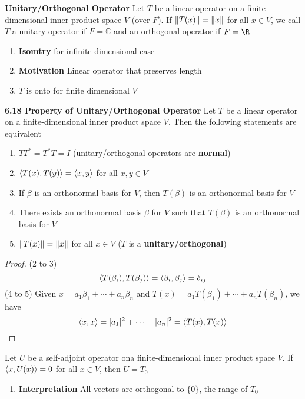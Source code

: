 \documentclass[11pt]{article}
\begin{document}

\begin{defn*}
    \textbf{Unitary/Orthogonal Operator} Let $T$ be a linear operator on a finite-dimensional inner product space $V$ (over $F$). If $\left\lVert T(x)\right\rVert = \left\lVert x\right\rVert$ for all $x\in V$, we call $T$ a unitary operator if $F = \mathbb{C}$ and an orthogonal operator if $F = \R$
    \begin{enumerate}
        \item \textbf{Isomtry} for infinite-dimensional case 
        \item \textbf{Motivation} Linear operator that preserves length
        \item $T$ is onto for finite dimensional $V$ 
    \end{enumerate}
\end{defn*}

\begin{theorem*}
    \textbf{6.18 Property of Unitary/Orthogonal Operator} Let $T$ be a linear operator on a finite-dimensional inner product space $V$. Then the following statements are equivalent 
    \begin{enumerate}
        \item $TT^* = T^*T = I$ (unitary/orthogonal operators are \textbf{normal})
        \item $\langle T(x),T(y)\rangle = \langle x,y\rangle$ for all $x,y\in V$
        \item If $\beta$ is an orthonormal basis for $V$, then $T(\beta)$ is an orthonormal basis for $V$ 
        \item There exists an orthonormal basis $\beta$ for $V$ such that $T(\beta)$ is an orthonormal basis for $V$ 
        \item $\left\lVert T(x)\right\rVert = \left\lVert x\right\rVert$ for all $x\in V$ ($T$ is a \textbf{unitary/orthogonal})
    \end{enumerate}
    \begin{proof}
        (2 to 3)
        \[
            \langle T(\beta_i),T(\beta_j)\rangle = \langle\beta_i,\beta_j\rangle = \delta_{ij}
        \]
        (4 to 5) Given $x = a_1 \beta_1 + \cdots + a_n \beta_n$ and $T(x) = a_1 T(\beta_1) + \cdots + a_n T(\beta_n)$, we have 
        \[
            \langle x,x\rangle = |a_1|^2 + \cdots + |a_n|^2 = \langle T(x),T(x)\rangle
        \]
    \end{proof}
\end{theorem*}

\begin{lemma*}
    Let $U$ be a self-adjoint operator ona finite-dimensional inner product space $V$. If $\langle x,U(x)\rangle = 0$ for all $x\in V$, then $U = T_0$
    \begin{enumerate}
        \item \textbf{Interpretation} All vectors are orthogonal to $\{ 0 \}$, the range of $T_0$
    \end{enumerate}
\end{lemma*}
\end{document}
